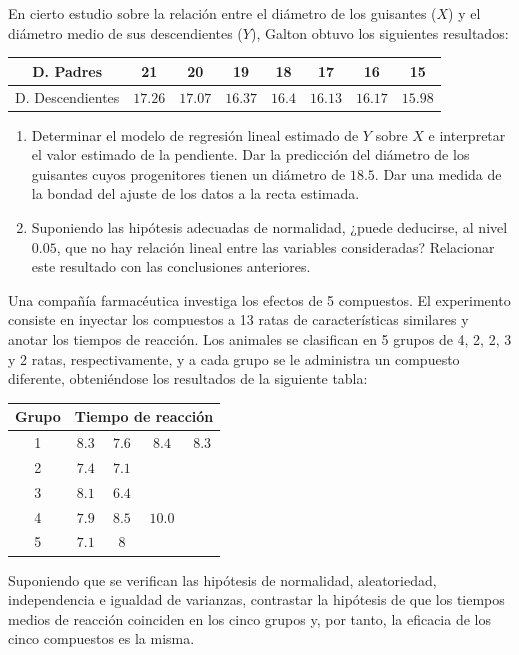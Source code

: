 \begin{ejercicio}
    En cierto estudio sobre la relación entre el diámetro de los guisantes ($X$) y el diámetro medio de sus descendientes ($Y$), Galton obtuvo los siguientes resultados:
    \begin{table}[H]
    \centering
    \begin{tabular}{c|ccccccc}
        D. Padres & 21 & 20 & 19 & 18 & 17 & 16 & 15 \\
        \hline
        D. Descendientes & $17.26$ & $17.07$ & $16.37$ & $16.4$ & $16.13$ & $16.17$ & $15.98$
    \end{tabular}
    \end{table}
    \begin{enumerate}[label=\alph*)]
        \item Determinar el modelo de regresión lineal estimado de $Y$ sobre $X$ e interpretar el valor estimado de la pendiente. Dar la predicción del diámetro de los guisantes cuyos progenitores tienen un diámetro de $18.5$. Dar una medida de la bondad del ajuste de los datos a la recta estimada.
        \item Suponiendo las hipótesis adecuadas de normalidad, ¿puede deducirse, al nivel $0.05$, que no hay relación lineal entre las variables consideradas? Relacionar este resultado con las conclusiones anteriores.
    \end{enumerate}
\end{ejercicio}

\begin{ejercicio}
    Una compañía farmacéutica investiga los efectos de 5 compuestos. El experimento consiste en inyectar los compuestos a 13 ratas de características similares y anotar los tiempos de reacción. Los animales se clasifican en 5 grupos de 4, 2, 2, 3 y 2 ratas, respectivamente, y a cada grupo se le administra un compuesto diferente, obteniéndose los resultados de la siguiente tabla:
    \begin{table}[H]
    \centering
    \begin{tabular}{c|cccc}
        Grupo & \multicolumn{4}{c}{Tiempo de reacción} \\
        \hline
        1 & $8.3$ & $7.6$ & $8.4$ & $8.3$ \\
        2 & $7.4$ & $7.1$ & & \\
        3 & $8.1$ & $6.4$ & & \\
        4 & $7.9$ & $8.5$ & $10.0$ & \\
        5 & $7.1$ & 8 & &
    \end{tabular}
    \end{table}
    \noindent
    Suponiendo que se verifican las hipótesis de normalidad, aleatoriedad, independencia e igualdad de varianzas, contrastar la hipótesis de que los tiempos medios de reacción coinciden en los cinco grupos y, por tanto, la eficacia de los cinco compuestos es la misma.
\end{ejercicio}

